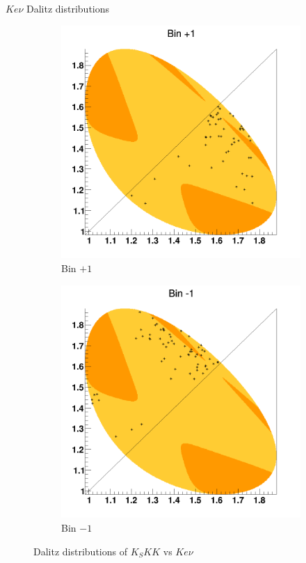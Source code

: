 \documentclass{beamer}
\begin{document}
\begin{frame}{$Ke\nu$ Dalitz distributions}
  \begin{figure}
    \centering
    \begin{subfigure}{0.5\textwidth}
      \centering
      \includegraphics[width=\textwidth]{Dalitzp1.png}
      \caption{Bin $+1$}
    \end{subfigure}%
    \begin{subfigure}{0.5\textwidth}
      \centering
      \includegraphics[width=\textwidth]{Dalitzm1.png}
      \caption{Bin $-1$}
    \end{subfigure}
    \caption{Dalitz distributions of $K_SKK$ vs $Ke\nu$}
  \end{figure}
\end{frame}
\end{document}
